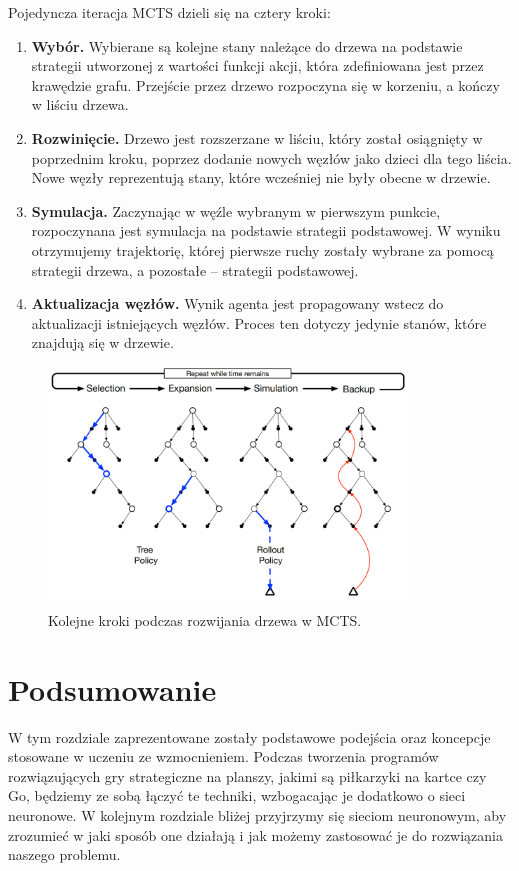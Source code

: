 \documentclass[licencjacka]{pracamgr}
\begin{document}
Pojedyncza iteracja MCTS dzieli się na cztery kroki:

\begin{enumerate}
\item \textbf{Wybór.} Wybierane są kolejne stany należące do drzewa na podstawie strategii utworzonej z wartości funkcji akcji, która zdefiniowana jest przez krawędzie grafu. Przejście przez drzewo rozpoczyna się w korzeniu, a kończy w liściu drzewa.
\item \textbf{Rozwinięcie.} Drzewo jest rozszerzane w liściu, który został osiągnięty w poprzednim kroku, poprzez dodanie nowych węzłów jako dzieci dla tego liścia. Nowe węzły reprezentują stany, które wcześniej nie były obecne w drzewie.
\item \textbf{Symulacja.} Zaczynając w węźle wybranym w pierwszym punkcie, rozpoczynana jest symulacja na podstawie strategii podstawowej. W wyniku otrzymujemy trajektorię, której pierwsze ruchy zostały wybrane za pomocą strategii drzewa, a pozostałe -- strategii podstawowej.
\item \textbf{Aktualizacja węzłów.} Wynik agenta jest propagowany wstecz do aktualizacji istniejących węzłów. Proces ten dotyczy jedynie stanów, które znajdują się w drzewie.
\end{enumerate}


\begin{figure}[ht!]
  \centering
  \includegraphics[width=0.85\textwidth]{mcts}
  \caption{Kolejne kroki podczas rozwijania drzewa w MCTS. \cite{Sutton}}
\end{figure}


\section{Podsumowanie}

W tym rozdziale zaprezentowane zostały podstawowe podejścia oraz koncepcje stosowane w uczeniu ze wzmocnieniem. Podczas tworzenia programów rozwiązujących gry strategiczne na planszy, jakimi są piłkarzyki na kartce czy Go, będziemy ze sobą łączyć te techniki, wzbogacając je dodatkowo o sieci neuronowe. W kolejnym rozdziale bliżej przyjrzymy się sieciom neuronowym, aby zrozumieć w jaki sposób one działają i jak możemy zastosować je do rozwiązania naszego problemu.
\end{document}
